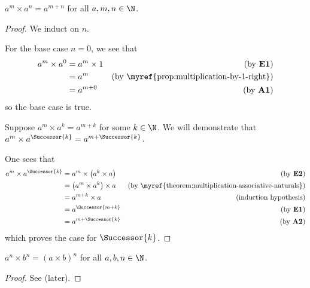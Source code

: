 \begin{theorem}\label{theorem:exponents-product-with-same-base}
    $a^m \times a^n = a^{m+n}$ for all $a, m, n \in \N$.
\end{theorem}
\begin{proof}
    We induct on $n$.

    For the base case $n = 0$, we see that
    \begin{align*}
        a^m \times a^0 &= a^m \times 1 & (\text{by \textbf{E1}})\\
        &= a^m & (\text{by \myref{prop:multiplication-by-1-right}})\\
        &= a^{m+0} & (\text{by \textbf{A1}})
    \end{align*}
    so the base case is true.

    Suppose $a^m \times a^k = a^{m+k}$ for some $k \in \N$. We will demonstrate that $a^m \times a^\Successor{k} = a^{m+\Successor{k}}$.

    One sees that
    \begin{align*}
        a^m \times a^\Successor{k} &= a^m \times \left(a^k \times a\right) & (\text{by \textbf{E2}})\\
        &= \left(a^m \times a^k\right) \times a & (\text{by \myref{theorem:multiplication-associative-naturals}})\\
        &= a^{m+k} \times a & (\text{induction hypothesis})\\
        &= a^{\Successor{m+k}} & (\text{by \textbf{E1}})\\
        &= a^{m+\Successor{k}} & (\text{by \textbf{A2}})
    \end{align*}
    which proves the case for $\Successor{k}$.
\end{proof}

\begin{theorem}\label{theorem:exponents-product-to-a-power}
    $a^n \times b^n = (a\times b)^n$ for all $a, b, n \in \N$.
\end{theorem}
\begin{proof}
    See  (later).
\end{proof}

